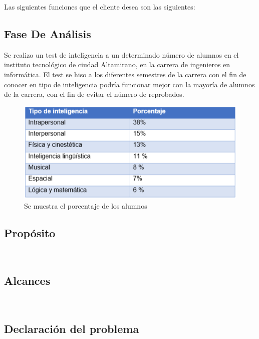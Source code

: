 \documentclass[letterpaper,oneside,openany,11pt]{book}
\begin{document}
Las siguientes funciones que el cliente desea son las siguientes:\\

\subsection{Fase De Análisis}
\noindent Se realizo un test de inteligencia a un determinado número de alumnos en el instituto tecnológico de ciudad Altamirano, en la carrera de ingenieros en informática. El test se hiso a los diferentes semestres de la carrera con el fin de conocer en tipo de inteligencia podría funcionar mejor con la mayoría de alumnos de la carrera, con el fin de evitar el número de reprobados.\\

\begin{figure}[H]
	\centering
	\includegraphics[width=1.0\textwidth]{./Imagenes/8}
	\caption{Se muestra el porcentaje de los alumnos}
\end{figure}

\subsection{Propósito}
\noindent \\

\subsection{Alcances}
\noindent \\

\subsection{Declaración del problema}
\noindent \\
\end{document}

